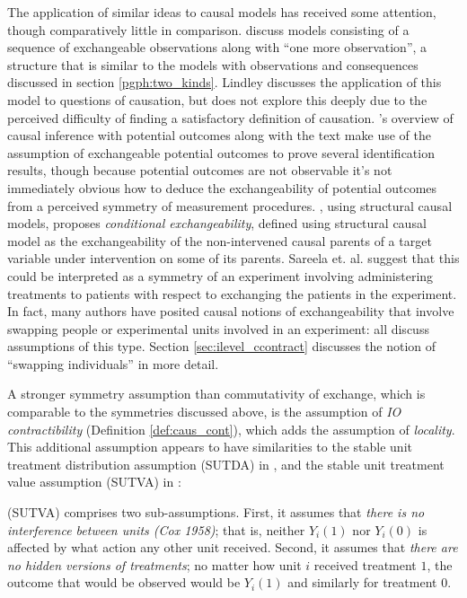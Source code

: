 The application of similar ideas to causal models has received some attention, though comparatively little in comparison. \citet{lindley_role_1981} discuss models consisting of a sequence of exchangeable observations along with ``one more observation'', a structure that is similar to the models with observations and consequences discussed in section \ref{pgph:two_kinds}. Lindley discusses the application of this model to questions of causation, but does not explore this deeply due to the perceived difficulty of finding a satisfactory definition of causation. \citet{rubin_causal_2005}'s overview of causal inference with potential outcomes along with the text \citet{imbens_causal_2015} make use of the assumption of exchangeable potential outcomes to prove several identification results, though because potential outcomes are not observable it's not immediately obvious how to deduce the exchangeability of potential outcomes from a perceived symmetry of measurement procedures. \citet{saarela_role_2020}, using structural causal models, proposes \emph{conditional exchangeability}, defined using structural causal model as the exchangeability of the non-intervened causal parents of a target variable under intervention on some of its parents. Sareela et. al. suggest that this could be interpreted as a symmetry of an experiment involving administering treatments to patients with respect to exchanging the patients in the experiment. In fact, many authors have posited causal notions of exchangeability that involve swapping people or experimental units involved in an experiment: \citet{hernan_estimating_2006,hernan_beyond_2012,greenland_identifiability_1986,banerjee_chapter_2017,dawid_decision-theoretic_2020} all discuss assumptions of this type. Section \ref{sec:ilevel_ccontract} discusses the notion of ``swapping individuals'' in more detail.

A stronger symmetry assumption than commutativity of exchange, which is comparable to the symmetries discussed above, is the assumption of \emph{IO contractibility} (Definition \ref{def:caus_cont}), which adds the assumption of \emph{locality}. This additional assumption appears to have similarities to the stable unit treatment distribution assumption (SUTDA) in \citet{dawid_decision-theoretic_2020}, and the stable unit treatment value assumption (SUTVA) in \citep{rubin_causal_2005}:
\begin{blockquote}
(SUTVA) comprises two sub-assumptions. First, it assumes that \emph{there is no interference between units (Cox 1958)}; that is, neither $Y_i(1)$ nor $Y_i(0)$ is affected by what action any other unit received. Second, it assumes that \emph{there are no hidden versions of treatments}; no matter how unit $i$ received treatment $1$, the outcome that would be observed would be $Y_i(1)$ and similarly for treatment $0$.
\end{blockquote}

